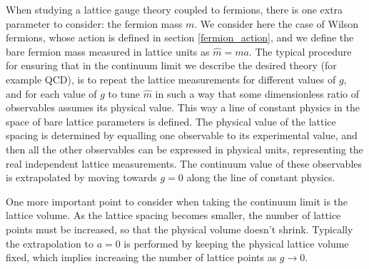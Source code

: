When studying a lattice gauge theory coupled to fermions, there is one extra parameter to consider: the fermion mass $m$. We consider here the case of Wilson fermions, whose action is defined in section \ref{fermion_action}, and we define the bare fermion mass measured in lattice units as $\hat m = m a$. The typical procedure for ensuring that in the continuum limit we describe the desired theory (for example QCD), is to repeat the lattice measurements for different values of $g$, and for each value of $g$ to tune $\hat m$ in such a way that some dimensionless ratio of observables assumes its physical value. This way a line of constant physics in the space of bare lattice parameters is defined. The physical value of the lattice spacing is determined by equalling one observable to its experimental value, and then all the other observables can be expressed in physical units, representing the real independent lattice measurements. The continuum value of these observables is extrapolated by moving towards $g=0$ along the line of constant physics.


One more important point to consider when taking the continuum limit is the lattice volume. As the lattice spacing becomes smaller, the number of lattice points must be increased, so that the physical volume doesn't shrink. Typically the extrapolation to $a = 0$ is performed by keeping the physical lattice volume fixed, which implies increasing the number of lattice points as $g \to 0$.





